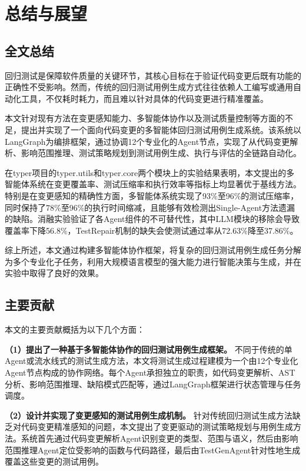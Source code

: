 
\chapter{总结与展望}

\section{全文总结}

回归测试是保障软件质量的关键环节，其核心目标在于验证代码变更后既有功能的正确性不受影响。然而，传统的回归测试用例生成方式往往依赖人工编写或通用自动化工具，不仅耗时耗力，而且难以针对具体的代码变更进行精准覆盖。

本文针对现有方法在变更感知能力、多智能体协作以及测试质量控制等方面的不足，提出并实现了一个面向代码变更的多智能体回归测试用例生成系统。该系统以LangGraph为编排框架，通过协调12个专业化的Agent节点，实现了从代码变更解析、影响范围推理、测试策略规划到测试用例生成、执行与评估的全链路自动化。

在typer项目的typer.utils和typer.core两个模块上的实验结果表明，本文提出的多智能体系统在变更覆盖率、测试压缩率和执行效率等指标上均显著优于基线方法。特别是在变更感知的精确性方面，多智能体系统实现了93\%至96\%的测试压缩率，同时保持了78\%至96\%的执行时间缩减，且能够有效检测出Single-Agent方法遗漏的缺陷。消融实验验证了各Agent组件的不可替代性，其中LLM模块的移除会导致覆盖率下降56.8\%，TestRepair机制的缺失会使测试通过率从72.63\%降至37.86\%。

综上所述，本文通过构建多智能体协作框架，将复杂的回归测试用例生成任务分解为多个专业化子任务，利用大规模语言模型的强大能力进行智能决策与生成，并在实验中取得了良好的效果。

\section{主要贡献}

本文的主要贡献概括为以下几个方面：

\textbf{（1）提出了一种基于多智能体协作的回归测试用例生成框架。} 不同于传统的单Agent或流水线式的测试生成方法，本文将测试生成过程建模为一个由12个专业化Agent节点构成的协作网络。每个Agent承担独立的职责，如代码变更解析、AST分析、影响范围推理、缺陷模式匹配等，通过LangGraph框架进行状态管理与任务调度。

\textbf{（2）设计并实现了变更感知的测试用例生成机制。} 针对传统回归测试生成方法缺乏对代码变更精准感知的问题，本文提出了变更驱动的测试策略规划与用例生成方法。系统首先通过代码变更解析Agent识别变更的类型、范围与语义，然后由影响范围推理Agent定位受影响的函数与代码路径，最后由TestGenAgent针对性地生成覆盖这些变更的测试用例。

